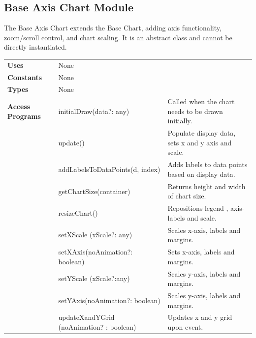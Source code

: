 \documentclass[12pt, titlepage]{article}
\begin{document}
\subsection{Base Axis Chart Module}
The Base Axis Chart extends the Base Chart, adding axis functionality, zoom/scroll control, and chart scaling. It is an abstract class and cannot be directly instantiated.
\begin{table}[H]
\begin{tabular}{l p{5cm}p{5cm}}
\textbf{Uses}            & None                                   &                                                     \\
\textbf{Constants}       & None                                   &                                       \\
\textbf{Types}           & None                                   &                                                     \\
\textbf{Access Programs} & initialDraw(data?: any)                & Called when the chart needs to be drawn initially.  \\
                         & update()                               & Populate display data, sets x and y axis and scale. \\
                         & addLabelsToDataPoints(d, index)        & Adds labels to data points based on display data.   \\
                         & getChartSize(container)                & Returns height and width of chart size.             \\
                         & resizeChart()                          & Repositions legend , axis-labels and scale.         \\
                         & setXScale (xScale?: any)                & Scales x-axis, labels and margins.                  \\
\textbf{}                & setXAxis(noAnimation?: boolean)        & Sets x-axis, labels and margins.                    \\
                         & setYScale (xScale?:any)                 & Scales y-axis, labels and margins.                  \\
                         & setYAxis(noAnimation?: boolean)         & Scales y-axis, labels and margins.                  \\
                         & updateXandYGrid (noAnimation? : boolean) & Updates x and y grid upon event. \\                    
\end{tabular}
\end{table}
\end{document}
